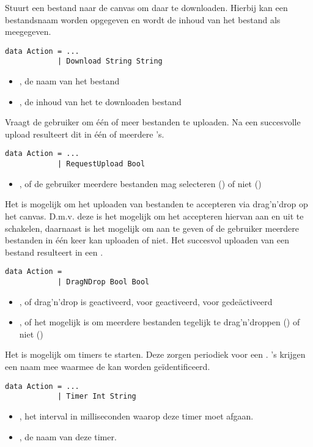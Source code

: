 Stuurt een bestand naar de canvas om daar te downloaden. Hierbij kan een bestandsnaam worden opgegeven en wordt de inhoud van het bestand als  meegegeven.
\begin{lstlisting}
data Action = ...
			| Download String String
\end{lstlisting}
\begin{itemize}
	\item {}, de naam van het bestand
	\item {}, de inhoud van het te downloaden bestand
\end{itemize}

Vraagt de gebruiker om één of meer bestanden te uploaden. Na een succesvolle upload resulteert dit in één of meerdere 's.
\begin{lstlisting}
data Action = ...
			| RequestUpload Bool
\end{lstlisting}
\begin{itemize}
	\item {}, of de gebruiker meerdere bestanden mag selecteren () of niet ()
\end{itemize}

Het is mogelijk om het uploaden van bestanden te accepteren via drag'n'drop op het canvas. D.m.v. deze  is het mogelijk om het accepteren hiervan aan en uit te schakelen, daarnaast is het mogelijk om aan te geven of de gebruiker meerdere bestanden in één keer kan uploaden of niet. Het succesvol uploaden van een bestand resulteert in een .
\begin{lstlisting}
data Action = 
			| DragNDrop Bool Bool
\end{lstlisting}
\begin{itemize}
	\item {}, of drag'n'drop is geactiveerd,  voor geactiveerd,  voor gedeäctiveerd
	\item {}, of het mogelijk is om meerdere bestanden tegelijk te drag'n'droppen () of niet ()
\end{itemize}

Het is mogelijk om timers te starten. Deze zorgen periodiek voor een . 's krijgen een naam mee waarmee de  kan worden geïdentificeerd.
\begin{lstlisting}
data Action = ...
			| Timer Int String
\end{lstlisting}
\begin{itemize}
	\item {}, het interval in milliseconden waarop deze timer moet afgaan.
	\item {}, de naam van deze timer.
\end{itemize}

